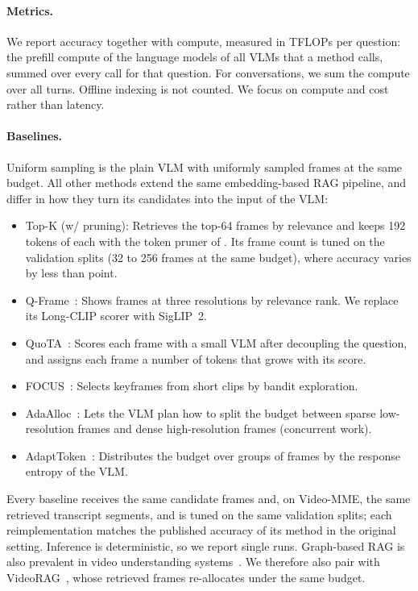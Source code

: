 \paragraph{Metrics.} We report accuracy together with compute, measured in TFLOPs per question: the prefill compute
of the language models of all VLMs that a method calls, summed over every call for that question. For conversations,
we sum the compute over all turns. Offline indexing is not counted. We focus on compute and cost rather than latency.

\paragraph{Baselines.} Uniform sampling is the plain VLM with uniformly sampled frames at the same budget. All other methods extend the same embedding-based RAG pipeline, and differ in how they turn its
candidates into the input of the VLM:
\begin{itemize}
  \item Top-K (w/ pruning): Retrieves the top-64 frames by relevance and keeps 192 tokens of each with the token
    pruner of \name. Its frame count is tuned on the validation splits (32 to 256 frames at the same budget), where accuracy varies by less than  point.
  \item Q-Frame~\cite{zhang2025qframe}: Shows frames at three resolutions by relevance rank. We replace its Long-CLIP scorer with SigLIP~2.
  \item QuoTA~\cite{luo2025quota}: Scores each frame with a small VLM after decoupling the question, and assigns
    each frame a number of tokens that grows with its score.
  \item FOCUS~\cite{zhu2026focus}: Selects keyframes from short clips by bandit exploration.
  \item AdaAlloc~\cite{an2026adaalloc}: Lets the VLM plan how to split the budget between sparse low-resolution
    frames and dense high-resolution frames (concurrent work).
  \item AdaptToken~\cite{qi2026adapttoken}: Distributes the budget over groups of frames by the response entropy of the VLM.
\end{itemize}
Every baseline receives the same candidate frames and, on Video-MME, the same retrieved transcript segments, and is tuned on the same validation splits; each
reimplementation matches the published accuracy of its method in the original setting. Inference is deterministic, so we report single runs.
Graph-based RAG is also prevalent in video understanding systems~\cite{ren2025videorag,shen2025vgent,yan2025ava,yang2026g2frag,chen2026memdreamer,yan2026ecrag}. We therefore also pair \name with VideoRAG~\cite{ren2025videorag}, whose retrieved frames \name re-allocates under the same budget.

